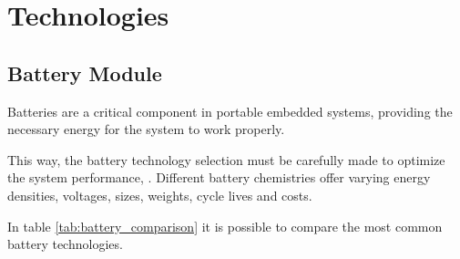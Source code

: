 \chapter{Technologies}
\label{chap:Chapter3}

\section{Battery Module}

Batteries are a critical component in portable embedded systems, providing the necessary energy for the system to work properly.

This way, the battery technology selection must be carefully made to optimize the system performance, \cite{BATT3}.
Different battery chemistries offer varying energy densities, voltages, sizes, weights, cycle lives and costs.

In table \ref{tab:battery_comparison} it is possible to compare the most common battery technologies.

\begin{table}[H]
    \centering
    \caption{Comparison of Battery Technologies}
    \label{tab:battery_comparison}
\end{table}

